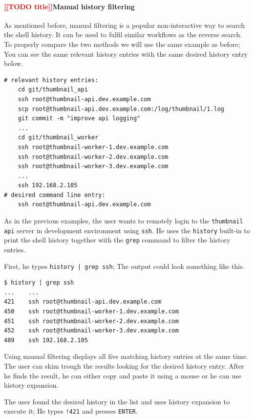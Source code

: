 \documentclass[thesis=M,english]{FITthesis}[2012/10/20]
\newcommand{\redtext}[1]{\textcolor{red}{[[#1]]}}
\begin{document}


\paragraph{\redtext{TODO title}Manual history filtering}

As mentioned before, manual filtering is a popular non-interactive way to search the shell history. It can be used to fulfil similar workflows as the reverse search. To properly compare the two methods we will use the same example as before; You can see the same relevant history entries with the same desired history entry below.


\begin{verbatim}
# relevant history entries:
    cd git/thumbnail_api
    ssh root@thumbnail-api.dev.example.com
    scp root@thumbnail-api.dev.example.com:/log/thumbnail/1.log
    git commit -m "improve api logging"
    ...
    cd git/thumbnail_worker
    ssh root@thumbnail-worker-1.dev.example.com
    ssh root@thumbnail-worker-2.dev.example.com
    ssh root@thumbnail-worker-3.dev.example.com
    ...
    ssh 192.168.2.105
# desired command line entry:
    ssh root@thumbnail-api.dev.example.com
\end{verbatim}

As in the previous examples, the user wants to remotely login to the \verb|thumbnail| \verb|api| server in development environment using \verb|ssh|. He uses the \verb|history| built-in to print the shell history together with the \verb|grep| command to filter the history entries.

First, he types \verb#history | grep ssh#; The output could look something like this.

\begin{verbatim}
$ history | grep ssh
...    ...
421    ssh root@thumbnail-api.dev.example.com
450    ssh root@thumbnail-worker-1.dev.example.com
451    ssh root@thumbnail-worker-2.dev.example.com
452    ssh root@thumbnail-worker-3.dev.example.com
489    ssh 192.168.2.105
\end{verbatim}


Using manual filtering displays all five matching history entries at the same time. The user can skim trough the results looking for the desired history entry. 
After he finds the result, he can either copy and paste it using a mouse or he can use history expansion.

The user found the desired history in the list and uses history expansion to execute it; He types \verb|!421| and presses \verb|ENTER|.
\end{document}
